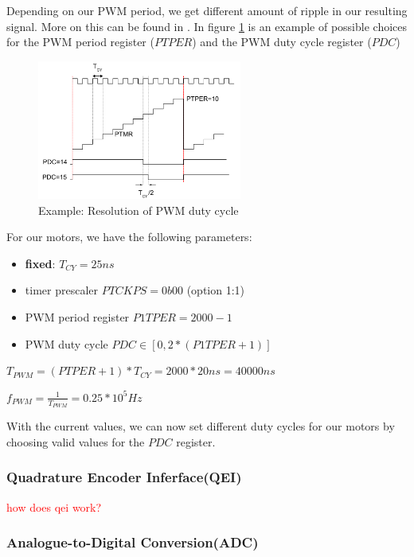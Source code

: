Depending on our PWM period, we get different amount of ripple in our resulting signal. More on this can be found in \cite[Chapter~5.1]{alex}. In figure \ref{fig:pwm_choice} is an example of possible choices for the PWM period register ($PTPER$) and the PWM duty cycle register ($PDC$)

\begin{figure}[htb]
    \centering
    \includegraphics[width=0.6\textwidth]{figures/software/pwm_choice.png}
    \caption {Example: Resolution of PWM duty cycle \cite{alex}}
    \label{fig:pwm_choice}
\end{figure}

For our motors, we have the following parameters:
\begin{itemize}
    \item \textbf{fixed}: $T_{CY} = 25 ns$
    \item timer prescaler $PTCKPS = 0b00$ (option 1:1)
    \item PWM period register $P1TPER = 2000 - 1$
    \item PWM duty cycle $PDC \in [0, 2*(P1TPER + 1)]$
\end{itemize}
$T_{PWM} = ( PTPER + 1 ) * T_{CY} = 2000 * 20ns = 40000 ns$


$f_{PWM} = \frac{1}{T_{PWM}} = 0.25 * 10^{5} Hz$

With the current values, we can now set different duty cycles for our motors by choosing valid values for the $PDC$ register.


\subsubsection*{Quadrature Encoder Inferface(QEI)}
\textcolor{red}{
how does qei work?
}

\subsubsection*{Analogue-to-Digital Conversion(ADC)}

